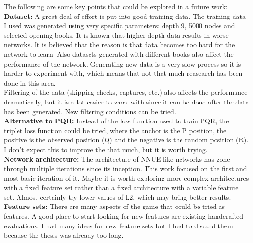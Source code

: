 The following are some key points that could be explored in a future work: \\

\textbf{Dataset:} A great deal of effort is put into good training data. The training data I used was generated using very specific parameters: depth 9, 5000 nodes and selected opening books. It is known that higher depth data results in worse networks. It is believed that the reason is that data becomes too hard for the network to learn. Also datasets generated with different books also affect the performance of the network.  Generating new data is a very slow process so it is harder to experiment with, which means that not that much reasearch has been done in this area. \\
Filtering of the data (skipping checks, captures, etc.) also affects the performance dramatically, but it is a lot easier to work with since it can be done after the data has been generated. New filtering conditions can be tried. \\

\textbf{Alternative to PQR:} Instead of the loss function used to train PQR, the triplet loss function could be tried, where the anchor is the P position, the positive is the observed position (Q) and the negative is the random position (R). I don't expect this to improve the that much, but it is worth trying. \\

\textbf{Network architecture:} The architecture of NNUE-like networks has gone through multiple iterations since its inception. This work focused on the first and most basic iteration of it. Maybe it is worth exploring more complex architectures with a fixed feature set rather than a fixed architecture with a variable feature set.
Almost certainly try lower values of L2, which may bring better results. \\

\textbf{Feature sets:} There are many aspects of the game that could be tried as features. A good place to start looking for new features are existing handcrafted evaluations. I had many ideas for new feature sets but I had to discard them because the thesis was already too long.
